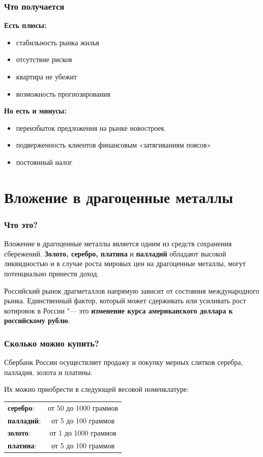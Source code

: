 \documentclass{beamer}
\newcommand{\col}{\textcolor[rgb]{0.2,0.,0.55}}
\begin{document}
		\begin{frame}
			\frametitle{Что получается}
		
			\textbf{Есть плюсы:}
			\begin{itemize}
				\item стабильность рынка жилья
				\item отсутствие рисков
				\item квартира не убежит
				\item возможность прогнозирования
			\end{itemize}
			
			\textbf{Но есть и минусы:}
			\begin{itemize}
				\item переизбыток предложения на рынке новостроек
				\item подверженность клиентов финансовым «затягиваниям поясов»
				\item постоянный налог
			\end{itemize}
		
		\end{frame}

	\section[Металлы]{Вложение в драгоценные металлы}

		\begin{frame}\frametitle{Что это?}
		Вложение в драгоценные металлы является одним из средств сохранения сбережений. 
		\textbf{\col{Золото, серебро, платина}} и \textbf{\col{палладий}} обладают высокой ликвидностью и в случае роста мировых цен на драгоценные металлы, могут потенциально принести  доход.
		
		\vspace{10pt}
		Российский рынок драгметаллов напрямую зависит от состояния международного рынка. Единственный фактор, который
		может сдерживать или усиливать рост котировок в России "--- это \textbf{изменение курса американского доллара к российскому рублю}.
		\end{frame}


		\begin{frame}\frametitle{Сколько можно купить?}
			Сбербанк России осуществляет продажу и покупку мерных слитков серебра, палладия, золота и платины. 
			
			Их можно приобрести в следующей весовой номенклатуре:
			\begin{center}
			\begin{tabular}{lc}
			\rowcolor{yellow!25}\textbf{серебро}: & от 50 до 1000 граммов\\
			\rowcolor{yellow!15}\textbf{палладий}: & от 5 до 100 граммов\\
			\rowcolor{yellow!25}\textbf{золото}: & от 1 до 1000 граммов\\
			\rowcolor{yellow!15}\textbf{платина}:  & от 5 до 100 граммов\\
			\end{tabular}
			\end{center}
		\end{frame}
		
\end{document}
